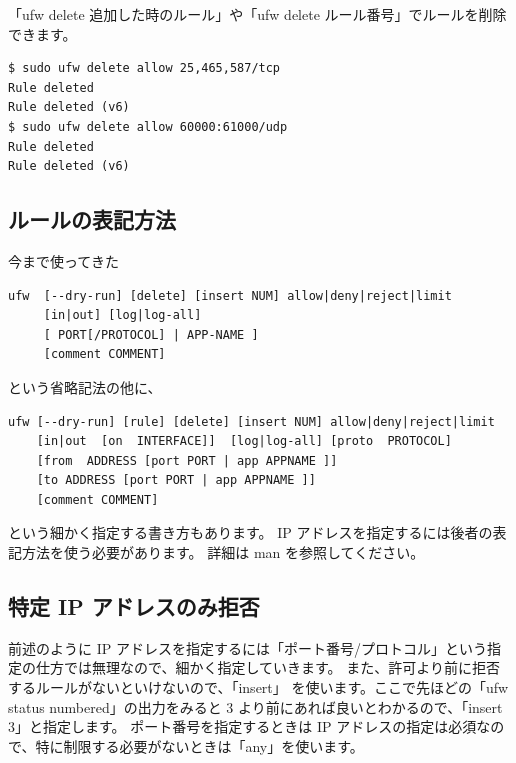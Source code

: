 \documentclass[mingoth,a4paper]{jsarticle}
\begin{document}
「ufw delete 追加した時のルール」や「ufw delete ルール番号」でルールを削除できます。

\begin{verbatim}
$ sudo ufw delete allow 25,465,587/tcp
Rule deleted
Rule deleted (v6)
$ sudo ufw delete allow 60000:61000/udp
Rule deleted
Rule deleted (v6)
\end{verbatim}

\subsection{ルールの表記方法}

今まで使ってきた

\begin{verbatim}
ufw  [--dry-run] [delete] [insert NUM] allow|deny|reject|limit
     [in|out] [log|log-all]
     [ PORT[/PROTOCOL] | APP‐NAME ]
     [comment COMMENT]
\end{verbatim}

という省略記法の他に、

\begin{verbatim}
ufw [--dry-run] [rule] [delete] [insert NUM] allow|deny|reject|limit
    [in|out  [on  INTERFACE]]  [log|log-all] [proto  PROTOCOL]
    [from  ADDRESS [port PORT | app APPNAME ]]
    [to ADDRESS [port PORT | app APPNAME ]]
    [comment COMMENT]
\end{verbatim}

という細かく指定する書き方もあります。
IP アドレスを指定するには後者の表記方法を使う必要があります。
詳細は man を参照してください。

\subsection{特定 IP アドレスのみ拒否}

前述のように IP アドレスを指定するには「ポート番号/プロトコル」という指定の仕方では無理なので、細かく指定していきます。
また、許可より前に拒否するルールがないといけないので、「insert」 を使います。ここで先ほどの「ufw status numbered」の出力をみると 3 より前にあれば良いとわかるので、「insert 3」と指定します。
ポート番号を指定するときは IP アドレスの指定は必須なので、特に制限する必要がないときは「any」を使います。
\end{document}
